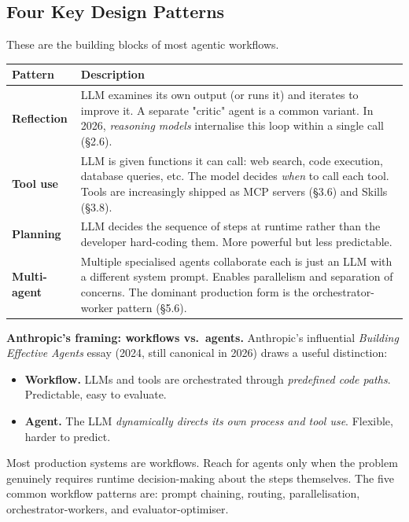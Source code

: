 \documentclass[a4paper,11pt]{article}
\begin{document}
\subsection{Four Key Design Patterns}

These are the building blocks of most agentic workflows.

\begin{center}\small
\begin{tabular}{p{2.8cm} p{10.2cm}}
  \toprule
  \textbf{Pattern} & \textbf{Description} \\
  \midrule
  \textbf{Reflection} &
    LLM examines its own output (or runs it) and iterates to improve
    it. A separate "critic" agent is a common variant. In 2026,
    \textit{reasoning models} internalise this loop within a single
    call (§2.6). \\[0.4em]
  \textbf{Tool use} &
    LLM is given functions it can call: web search, code execution,
    database queries, etc. The model decides \textit{when} to call
    each tool. Tools are increasingly shipped as MCP servers (§3.6)
    and Skills (§3.8). \\[0.4em]
  \textbf{Planning} &
    LLM decides the sequence of steps at runtime rather than the
    developer hard-coding them. More powerful but less predictable. \\[0.4em]
  \textbf{Multi-agent} &
    Multiple specialised agents collaborate \textemdash{} each is just
    an LLM with a different system prompt. Enables parallelism and
    separation of concerns. The dominant production form is the
    orchestrator-worker pattern (§5.6). \\
  \bottomrule
\end{tabular}
\end{center}

\begin{callout}
\textbf{Anthropic's framing: workflows vs.\ agents.}
Anthropic's influential \textit{Building Effective Agents} essay
(2024, still canonical in 2026) draws a useful distinction:

\begin{itemize}[noitemsep, leftmargin=1.2em, topsep=2pt]
  \item \textbf{Workflow.} LLMs and tools are orchestrated through
        \emph{predefined code paths}. Predictable, easy to evaluate.
  \item \textbf{Agent.} The LLM \emph{dynamically directs its own
        process and tool use}. Flexible, harder to predict.
\end{itemize}

Most production systems are workflows. Reach for agents only when the
problem genuinely requires runtime decision-making about the steps
themselves. The five common workflow patterns are: prompt chaining,
routing, parallelisation, orchestrator-workers, and
evaluator-optimiser.
\end{callout}
\end{document}
